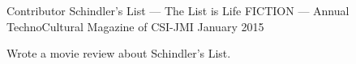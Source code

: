 
\begin{cventries}

\cventry%
  {Contributor} %
  {Schindler's List --- The List is Life} %
  {FICTION --- Annual TechnoCultural Magazine of CSI-JMI} %
  {January 2015} %
  {%
    \begin{cvitems} %
      \item{Wrote a movie review about Schindler's List.}
    \end{cvitems}
  }

\end{cventries}
